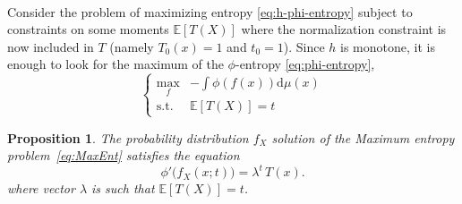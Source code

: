 \documentclass[english,onecolumn]{elsarticle}
\def\dmu{\mathrm{d}\mu}
\def\Esp{\mathbb{E}}
\newtheorem{proposition}{Proposition}
\begin{document}
\

Consider the  problem of maximizing entropy  \eqref{eq:h-phi-entropy} subject to
constraints  on  some moments  $\Esp\left[T(X)\right]$  where the  normalization
constraint is now included in $T$ (namely $T_0(x) = 1$ and $t_0 = 1$). Since $h$
is  monotone,  it is  enough  to  look for  the  maximum  of the  $\phi$-entropy
\eqref{eq:phi-entropy},
\begin{equation}
\begin{cases}
\max_f & \displaystyle -\int \phi(f(x))\dmu(x)\\[2mm]
%
\text{s.t. } & \Esp\left[T(X)\right] = t%
%
\end{cases}
\label{eq:MaxEnt}
\end{equation}
%
\begin{proposition}
  The   probability  distribution   $f_X$  solution   of  the   Maximum  entropy
  problem~\eqref{eq:MaxEnt} satisfies the equation
%
\begin{equation}
\phi' \big( f_X(x;t) \big) = \lambda^t \, T(x).
\label{eq:sol-h-phi}
\end{equation}
%
where vector $\lambda$ is such that $\Esp[T(X)] = t$.
\end{proposition}
%
\end{document}

